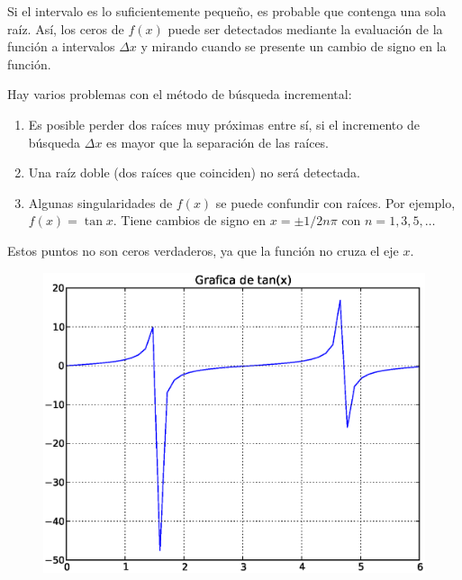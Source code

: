 \documentclass[12pt]{beamer}
\begin{document}
\begin{frame}
Si el intervalo es lo suficientemente pequeño, es probable que contenga una sola ra\'{i}z. As\'{i}, los ceros de $f(x)$ puede ser detectados mediante la evaluaci\'{o}n de la funci\'{o}n a intervalos $\Delta x$ y mirando cuando se presente un cambio de signo en la funci\'{o}n.
\end{frame}
\begin{frame}
Hay varios problemas con el m\'{e}todo de b\'{u}squeda incremental:
\begin{enumerate}
\item Es posible perder dos ra\'{i}ces muy pr\'{o}ximas entre s\'{i}, si el incremento de búsqueda $\Delta x$ es mayor que la separaci\'{o}n de las ra\'{i}ces.
\item Una ra\'{i}z doble (dos ra\'{i}ces que coinciden) no ser\'{a} detectada.
\item Algunas singularidades de $f(x)$ se puede confundir con ra\'{i}ces. Por ejemplo, $f(x) = \tan x$. Tiene cambios de signo en $x = \pm 1/2 n\pi$ con $n = 1, 3, 5,\ldots$
\end{enumerate}
\end{frame}
\begin{frame}
Estos puntos no son ceros verdaderos, ya que la funci\'{o}n no cruza el eje $x$.
\begin{figure}
	\centering
	\includegraphics[scale=0.4]{raices05.eps} 
\end{figure}
\end{frame}
\end{document}
